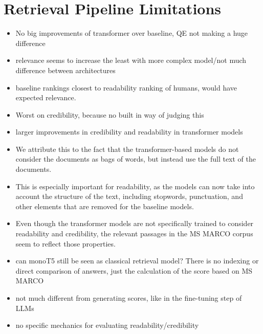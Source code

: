 \section{Retrieval Pipeline Limitations}
\begin{itemize}
    \item No big improvements of transformer over baseline, QE not making a huge difference
    \item relevance seems to increase the least with more complex model/not much difference between architectures
    \item baseline rankings closest to readability ranking of humans, would have expected relevance.
    \item Worst on credibility, because no built in way of judging this
    \item larger improvements in credibility and readability in transformer models
    \item We attribute this to the fact that the transformer-based models do not consider the documents as bags of words, but instead use the full text of the documents.
    \item This is especially important for readability, as the models can now take into account the structure of the text, including stopwords, punctuation, and other elements that are removed for the baseline models.
    \item Even though the transformer models are not specifically trained to consider readability and credibility, the relevant passages in the MS MARCO corpus seem to reflect those properties.
    \item can monoT5 still be seen as classical retrieval model? There is no indexing or direct comparison of answers, just the calculation of the score based on MS MARCO
    \item not much different from generating scores, like in the fine-tuning step of LLMs
    \item no specific mechanics for evaluating readability/credibility
\end{itemize}


